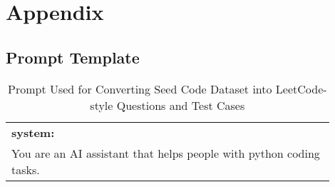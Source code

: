 \section{Appendix}
\label{sec:appendix}


\subsection{Prompt Template}
\label{appendix:seed_code_prompt}

\begin{table*}[h]
\centering
\caption{Prompt Used for Converting Seed Code Dataset into LeetCode-style Questions and Test Cases}
\begin{tabular}{|p{0.9\linewidth}|}
\hline
\textbf{system:}\\
You are an AI assistant that helps people with python coding tasks.
\\ \hline


\end{tabular}
\end{table*}
